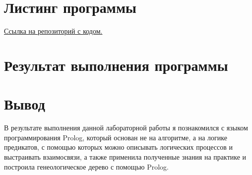 \documentclass[12pt]{report}
\begin{document}
	\section*{Листинг программы}
	\href{https://github.com/mysticslippers/artificial_intelligence_systems_archive/blob/main/Lab1_ais/code/src.pl}{Ссылка на репозиторий с кодом.}
	
	
	
	\section*{Результат выполнения программы}
	
	\section*{Вывод}
	В результате выполнения данной лабораторной работы я познакомился с языком программирования Prolog, который основан не на алгоритме, а на логике предикатов, с помощью которых можно описывать логических процессов и выстраивать взаимосвязи, а также применила полученные знания на практике и построила генеологическое дерево с помощью Prolog.
\end{document}

